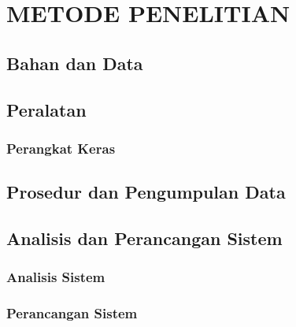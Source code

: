 \chapter{METODE PENELITIAN}
\section{Bahan dan Data}

\section{Peralatan}

\subsection{Perangkat Keras}


\section{Prosedur dan Pengumpulan Data}

\section{Analisis dan Perancangan Sistem}
\subsection{Analisis Sistem}

\subsection{Perancangan Sistem}
